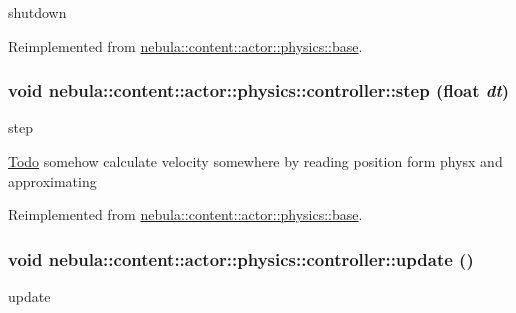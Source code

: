 shutdown 

Reimplemented from \hyperlink{classnebula_1_1content_1_1actor_1_1physics_1_1base_a6de64e1ab1a4e3dd3274bfa722c7aed1}{nebula::content::actor::physics::base}.\hypertarget{classnebula_1_1content_1_1actor_1_1physics_1_1controller_a76e049f3e302ed369ed9d2820487cc3e}{
\subsubsection[{step}]{\setlength{\rightskip}{0pt plus 5cm}void nebula::content::actor::physics::controller::step (float {\em dt})}}
\label{classnebula_1_1content_1_1actor_1_1physics_1_1controller_a76e049f3e302ed369ed9d2820487cc3e}


step 

\begin{Desc}
\item[\hyperlink{todo__todo000002}{Todo}]somehow calculate velocity somewhere by reading position form physx and approximating \end{Desc}


Reimplemented from \hyperlink{classnebula_1_1content_1_1actor_1_1physics_1_1base_aac025359e301532039709ea8697bb29f}{nebula::content::actor::physics::base}.\hypertarget{classnebula_1_1content_1_1actor_1_1physics_1_1controller_abda74fc66665e489ae6364efd1eb7e30}{
\subsubsection[{update}]{\setlength{\rightskip}{0pt plus 5cm}void nebula::content::actor::physics::controller::update ()}}
\label{classnebula_1_1content_1_1actor_1_1physics_1_1controller_abda74fc66665e489ae6364efd1eb7e30}


update 

